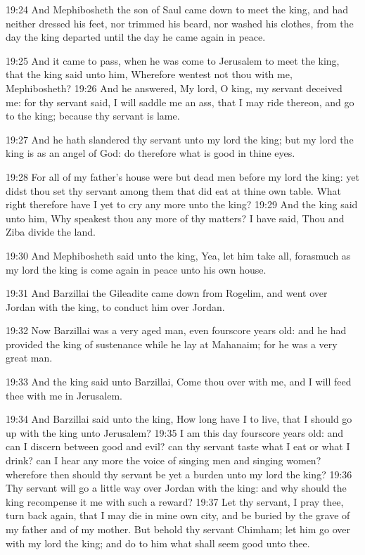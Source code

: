 19:24 And Mephibosheth the son of Saul came down to meet the king, and had neither dressed his feet, nor trimmed his beard, nor washed his clothes, from the day the king departed until the day he came again in peace.

19:25 And it came to pass, when he was come to Jerusalem to meet the king, that the king said unto him, Wherefore wentest not thou with me, Mephibosheth?  19:26 And he answered, My lord, O king, my servant deceived me: for thy servant said, I will saddle me an ass, that I may ride thereon, and go to the king; because thy servant is lame.

19:27 And he hath slandered thy servant unto my lord the king; but my lord the king is as an angel of God: do therefore what is good in thine eyes.

19:28 For all of my father's house were but dead men before my lord the king: yet didst thou set thy servant among them that did eat at thine own table. What right therefore have I yet to cry any more unto the king?  19:29 And the king said unto him, Why speakest thou any more of thy matters? I have said, Thou and Ziba divide the land.

19:30 And Mephibosheth said unto the king, Yea, let him take all, forasmuch as my lord the king is come again in peace unto his own house.

19:31 And Barzillai the Gileadite came down from Rogelim, and went over Jordan with the king, to conduct him over Jordan.

19:32 Now Barzillai was a very aged man, even fourscore years old: and he had provided the king of sustenance while he lay at Mahanaim; for he was a very great man.

19:33 And the king said unto Barzillai, Come thou over with me, and I will feed thee with me in Jerusalem.

19:34 And Barzillai said unto the king, How long have I to live, that I should go up with the king unto Jerusalem?  19:35 I am this day fourscore years old: and can I discern between good and evil? can thy servant taste what I eat or what I drink? can I hear any more the voice of singing men and singing women? wherefore then should thy servant be yet a burden unto my lord the king?  19:36 Thy servant will go a little way over Jordan with the king: and why should the king recompense it me with such a reward?  19:37 Let thy servant, I pray thee, turn back again, that I may die in mine own city, and be buried by the grave of my father and of my mother. But behold thy servant Chimham; let him go over with my lord the king; and do to him what shall seem good unto thee.


